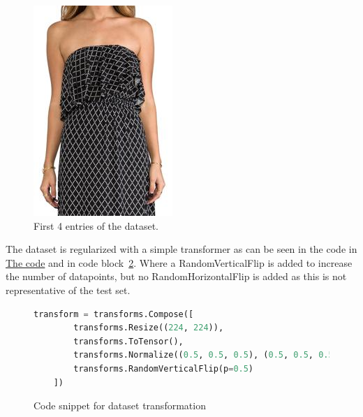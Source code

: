 \documentclass{article}
\begin{document}
\begin{figure}[ht]
\begin{minipage}[b]{0.2\linewidth}
        \includegraphics[width=\linewidth]{imgs/00003.jpg}
    \end{minipage}
    \caption{First 4 entries of the dataset.}
    \label{fig:four_images}
\end{figure}


The dataset is regularized with a simple transformer as can be seen in the code in \href{https://github.com/Riemer1818/AI6126-AdCV-Proj1/blob/main/code/finalCode.py}{The code} and in code block~\ref{fig:transform_code}. Where a RandomVerticalFlip is added to increase the number of datapoints, but no RandomHorizontalFlip is added as this is not representative of the test set. 

\begin{figure}[ht]
    \centering
    \begin{lstlisting}[language=Python]
    transform = transforms.Compose([
        transforms.Resize((224, 224)),
        transforms.ToTensor(),
        transforms.Normalize((0.5, 0.5, 0.5), (0.5, 0.5, 0.5)),
        transforms.RandomVerticalFlip(p=0.5)
    ])
    \end{lstlisting}
    \caption{Code snippet for dataset transformation}
    \label{fig:transform_code}
\end{figure}
\end{document}
